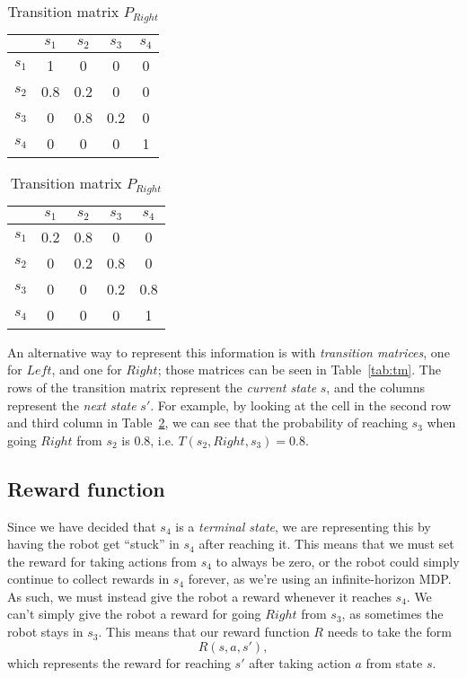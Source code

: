 \documentclass[a4paper]{article}
\begin{document}
\begin{table}[h!]
  \caption{
    Transition matrix representation of $\transFunc$.
  }
  \label{tab:tm}
  \begin{subtable}{.5\linewidth}
    \centering
    \caption{Transition matrix $P_{Left}$}
    \label{tab:tm_left}
    \begin{tabular}{c|cccc}
            &$s_1$&$s_2$&$s_3$&$s_4$\\
      \hline
      $s_1$ & 1   & 0   & 0   & 0   \\
      $s_2$ & 0.8 & 0.2 & 0   & 0   \\
      $s_3$ & 0   & 0.8 & 0.2 & 0   \\
      $s_4$ & 0   & 0   & 0   & 1
    \end{tabular}
  \end{subtable}
  \begin{subtable}{.5\linewidth}
    \centering
    \caption{Transition matrix $P_{Right}$}
    \label{tab:tm_right}
    \begin{tabular}{c|cccc}
            &$s_1$&$s_2$&$s_3$&$s_4$\\
      \hline
      $s_1$ & 0.2 & 0.8 & 0   & 0   \\
      $s_2$ & 0   & 0.2 & 0.8 & 0   \\
      $s_3$ & 0   & 0   & 0.2 & 0.8 \\
      $s_4$ & 0   & 0   & 0   & 1
    \end{tabular}
  \end{subtable}
\end{table}

An alternative way to represent this information is with
\emph{transition matrices}, one for $Left$, and one for $Right$;
those matrices can be seen in Table~\ref{tab:tm}.
The rows of the transition matrix represent the \emph{current state} $s$,
and the columns represent the \emph{next state} $s'$.
For example, by looking at the cell in the second row and third column in
Table~\ref{tab:tm_right}, we can see that the probability of reaching
$s_3$ when going $Right$ from $s_2$ is 0.8,
i.e. $T(s_2, Right, s_3) = 0.8$.

\subsection{Reward function}
Since we have decided that $s_4$ is a \emph{terminal state}, we are
representing this by having the robot get ``stuck'' in $s_4$ after reaching
it.
This means that we must set the reward for taking actions from $s_4$ to
always be zero, or the robot could simply continue to collect rewards in
$s_4$ forever, as we're using an infinite-horizon MDP.
As such, we must instead give the robot a reward whenever it reaches
$s_4$.
We can't simply give the robot a reward for going $Right$ from $s_3$, as
sometimes the robot stays in $s_3$.
This means that our reward function $R$ needs to take the form
$$R(s, a, s') , $$
which represents the reward for reaching $s'$ after taking action $a$
from state $s$.
\end{document}
